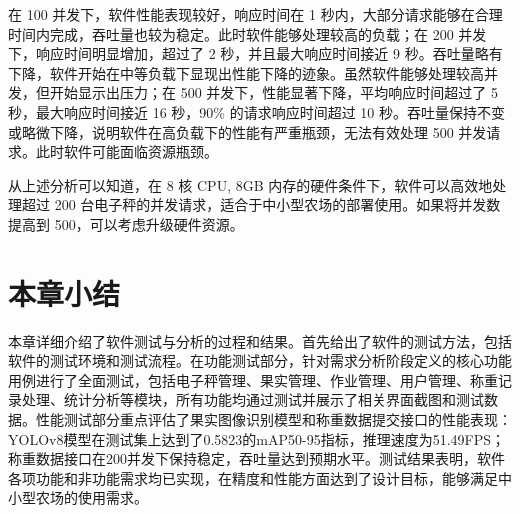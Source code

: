 在 100 并发下，软件性能表现较好，响应时间在 1 秒内，大部分请求能够在合理时间内完成，吞吐量也较为稳定。此时软件能够处理较高的负载；在 200 并发下，响应时间明显增加，超过了 2 秒，并且最大响应时间接近 9 秒。吞吐量略有下降，软件开始在中等负载下显现出性能下降的迹象。虽然软件能够处理较高并发，但开始显示出压力；在 500 并发下，性能显著下降，平均响应时间超过了 5 秒，最大响应时间接近 16 秒，90\% 的请求响应时间超过 10 秒。吞吐量保持不变或略微下降，说明软件在高负载下的性能有严重瓶颈，无法有效处理 500 并发请求。此时软件可能面临资源瓶颈。

从上述分析可以知道，在 8 核 CPU, 8GB 内存的硬件条件下，软件可以高效地处理超过 200 台电子秤的并发请求，适合于中小型农场的部署使用。如果将并发数提高到 500，可以考虑升级硬件资源。

\section{本章小结}

本章详细介绍了软件测试与分析的过程和结果。首先给出了软件的测试方法，包括软件的测试环境和测试流程。在功能测试部分，针对需求分析阶段定义的核心功能用例进行了全面测试，包括电子秤管理、果实管理、作业管理、用户管理、称重记录处理、统计分析等模块，所有功能均通过测试并展示了相关界面截图和测试数据。性能测试部分重点评估了果实图像识别模型和称重数据提交接口的性能表现：YOLOv8模型在测试集上达到了0.5823的mAP50-95指标，推理速度为51.49FPS；称重数据接口在200并发下保持稳定，吞吐量达到预期水平。测试结果表明，软件各项功能和非功能需求均已实现，在精度和性能方面达到了设计目标，能够满足中小型农场的使用需求。
